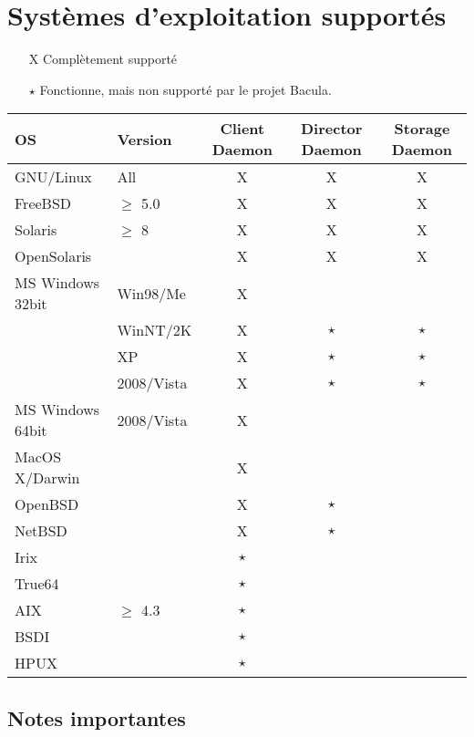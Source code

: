 
\chapter{Syst\`emes d'exploitation support\'es}
\label{SupportedOSes}

\begin{itemize}
\item[X] Compl\`etement support\'e
\item[$\star$] Fonctionne, mais non support\'e par le projet Bacula.
\end{itemize}


\begin{tabular}[h]{|l|l|c|c|c|}
  \hline
  OS & Version & Client \small{Daemon} & Director \small{Daemon} & Storage \small{Daemon} \\
  \hline
  \hline
  GNU/Linux
  & All & X & X & X \\
  \hline
  FreeBSD & $\geq$ 5.0 & X & X & X
  \\
  \hline
  Solaris & $\geq$ 8 & X & X & X \\
  \hline
  OpenSolaris & ~ & X & X & X \\
  \hline
  \hline
  MS Windows 32bit& Win98/Me & X  & ~ & ~ \\
  \hline
  ~ & WinNT/2K & X  & $\star$ & $\star$ \\
  \hline
  ~ & XP & X  & $\star$ & $\star$ \\
  ~ & 2008/Vista & X  & $\star$ & $\star$ \\
  MS Windows 64bit& 2008/Vista & X  & ~ & ~ \\
  \hline
  \hline
  MacOS X/Darwin & ~ & X & ~ & ~ \\
  \hline
  OpenBSD & ~ & X & $\star$ & ~ \\
  \hline
  NetBSD & ~ & X & $\star$ & ~ \\
  \hline
  Irix & ~ & $\star$ & ~ & ~ \\
  \hline
  True64 & ~ & $\star$ & ~ & ~ \\
  \hline
  AIX & $\geq$ 4.3 & $\star$ & ~ & ~ \\
  \hline
  BSDI & ~ & $\star$ & ~ & ~ \\
  \hline
  HPUX & ~ & $\star$ & ~ & ~ \\
  \hline
\end{tabular}


\section*{Notes importantes}

